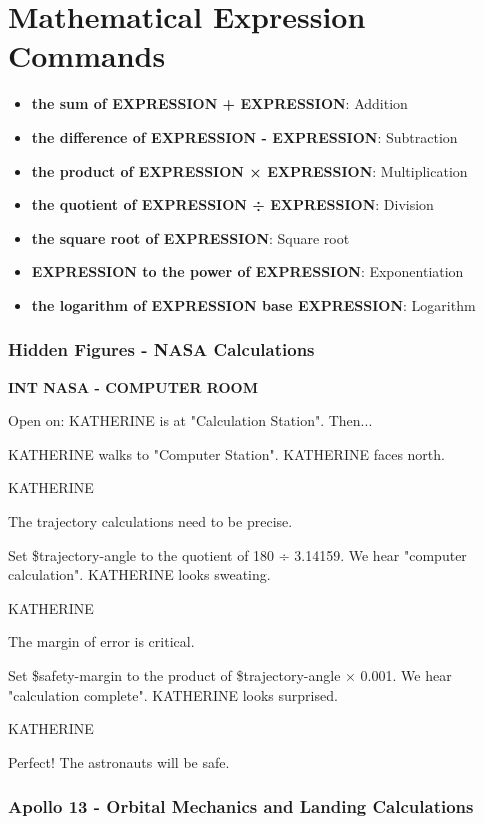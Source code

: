 \documentclass[11pt,letterpaper,oldstylefigures]{memoir}
\newcommand{\slugline}[1]{\nobreak\textbf{\MakeUppercase{#1}}\par\nobreak\vspace{1\baselineskip}}
\newcommand{\speaker}[1]{\nobreak\hspace*{0.333\textwidth}\MakeUppercase{#1}\par\nobreak\vspace{0.5\baselineskip}}
\newcommand{\dialogue}[1]{\nobreak\hspace*{0.25\textwidth}\begin{minipage}{0.5\textwidth}#1\end{minipage}\par\vspace{1\baselineskip}}
\newcommand{\stagedir}[1]{#1\par\vspace{1\baselineskip}}
\newenvironment{FountainExample}
  {\begingroup
  \ttfamily\small
   \setlength{\parindent}{0pt}
  \setlength{\parskip}{0.5em}
  \allowdisplaybreaks
  \setlength{\displaywidowpenalty}{0}
  \setlength{\widowpenalty}{0}
  \setlength{\clubpenalty}{0}
  \setlength{\interlinepenalty}{0}
}
  {\endgroup}
\newcommand{\fountain}[1]{\textbf{#1}}
\begin{document}
\section{Mathematical Expression Commands}
\begin{itemize}
\item \fountain{the sum of EXPRESSION + EXPRESSION}: Addition
\item \fountain{the difference of EXPRESSION - EXPRESSION}: Subtraction
\item \fountain{the product of EXPRESSION × EXPRESSION}: Multiplication
\item \fountain{the quotient of EXPRESSION ÷ EXPRESSION}: Division
\item \fountain{the square root of EXPRESSION}: Square root
\item \fountain{EXPRESSION to the power of EXPRESSION}: Exponentiation
\item \fountain{the logarithm of EXPRESSION base EXPRESSION}: Logarithm
\end{itemize}

\subsubsection*{Hidden Figures - NASA Calculations}
\label{ex:hidden-figures-nasa-calculations}

\begin{FountainExample}
\slugline{INT NASA - COMPUTER ROOM}

\stagedir{Open on: KATHERINE is at "Calculation Station". Then...}

\stagedir{KATHERINE walks to "Computer Station". KATHERINE faces north.}

\speaker{KATHERINE}
\dialogue{The trajectory calculations need to be precise.}

\stagedir{Set \$trajectory-angle to the quotient of 180 ÷ 3.14159. We hear "computer calculation". KATHERINE looks sweating.}

\speaker{KATHERINE}
\dialogue{The margin of error is critical.}

\stagedir{Set \$safety-margin to the product of \$trajectory-angle × 0.001. We hear "calculation complete". KATHERINE looks surprised.}

\speaker{KATHERINE}
\dialogue{Perfect! The astronauts will be safe.}
\end{FountainExample}

\subsubsection*{Apollo 13 - Orbital Mechanics and Landing Calculations}
\label{ex:apollo-13-orbital-mechanics}
\end{document}
